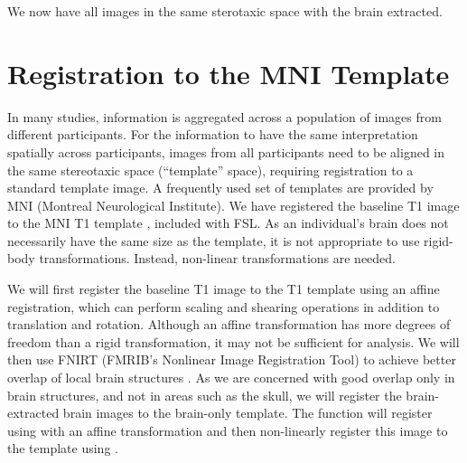 We now have all images in the same sterotaxic space with the brain extracted.  

\section{Registration to the MNI Template}
In many studies, information is aggregated across a population of images from different participants.  For the information to have the same interpretation spatially across participants, images from all participants need to be aligned in the same stereotaxic space (``template'' space), requiring registration to a standard template image.  A frequently used set of templates are provided by MNI (Montreal Neurological Institute). We have registered the baseline T1 image to the MNI T1 template \citep{hutchison_symmetric_2006}, included with FSL.  As an individual's brain does not necessarily have the same size as the template, it is not appropriate to use rigid-body transformations.  Instead, non-linear transformations are needed.


We will first register the baseline T1 image to the T1 template using an affine registration, which can perform scaling and shearing operations in addition to translation and rotation.  Although an affine transformation has more degrees of freedom than a rigid transformation, it may not be sufficient for analysis.  We will then use FNIRT (FMRIB's Nonlinear Image Registration Tool) to achieve better overlap of local brain structures \citep{jenkinson_fsl_2012, andersson_non-linear_2007}.  As we are concerned with good overlap only in brain structures, and not in areas such as the skull, we will register the brain-extracted brain images to the brain-only template.  The  function  will register using  with an affine transformation and then non-linearly register this image to the template using .


\gobblepars
\begin{knitrout}
\color{fgcolor}\begin{kframe}
\begin{alltt}
\hlstd{(} \hlstd{=} \hlstd{,}
                   \hlstd{=} \hlstd{(}\hlstd{(),} \hlstd{,} \hlstd{,} \hlstd{),}
                   \hlstd{=} \hlstd{,}
                   \hlstd{=} \hlstd{,}
                   \hlstd{=} \hlstd{)}
\end{alltt}
\end{kframe}
\end{knitrout}
\gobblepars

